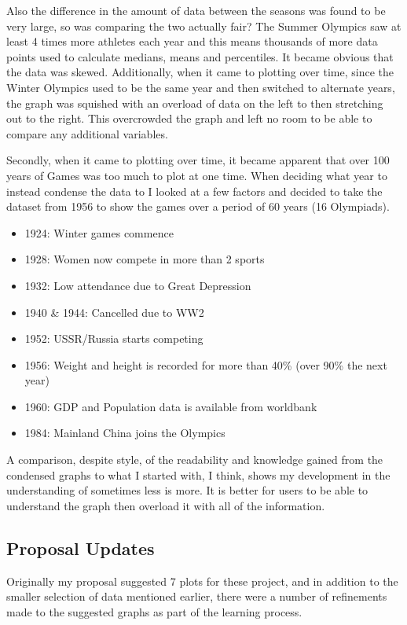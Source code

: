 \documentclass[a4 paper, 12pt]{article}
\begin{document}
            Also the difference in the amount of data between the seasons was found to be very large, so was comparing the two actually fair? The Summer Olympics saw at least 4 times more athletes each year and this means thousands of more data points used to calculate medians, means and percentiles. It became obvious that the data was skewed. Additionally, when it came to plotting over time, since the Winter Olympics used to be the same year and then switched to alternate years, the graph was squished with an overload of data on the left to then stretching out to the right. This overcrowded the graph and left no room to be able to compare any additional variables. 
    
            Secondly, when it came to plotting over time, it became apparent that over 100 years of Games was too much to plot at one time. When deciding what year to instead condense the data to I looked at a few factors and decided to take the dataset from 1956 to show the games over a period of 60 years (16 Olympiads).
                \begin{itemize}
                    \item 1924: Winter games commence
                    \item 1928: Women now compete in more than 2 sports
                    \item 1932: Low attendance due to Great Depression
                    \item 1940 \& 1944: Cancelled due to WW2
                    \item 1952: USSR/Russia starts competing
                    \item 1956: Weight and height is recorded for more than 40\% (over 90\% the next year)
                    \item 1960: GDP and Population data is available from worldbank
                    \item 1984: Mainland China joins the Olympics
                \end{itemize}
            A comparison, despite style, of the readability and knowledge gained from the condensed graphs to what I started with, I think, shows my development in the understanding of sometimes less is more. It is better for users to be able to understand the graph then overload it with all of the information. 

            \subsection{Proposal Updates}
            Originally my proposal suggested 7 plots for these project, and in addition to the smaller selection of data mentioned earlier, there were a number of refinements made to the suggested graphs as part of the learning process.
    
\end{document}

